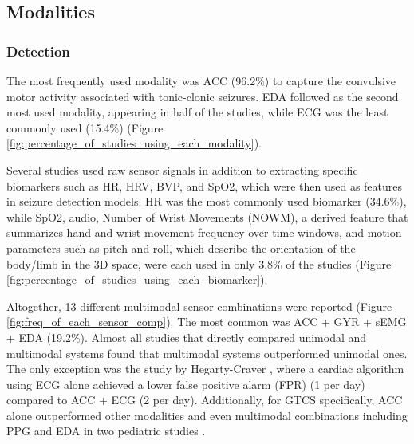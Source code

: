 \subsection{Modalities}


\subsubsection{Detection}
The most frequently used modality was ACC (96.2\%) to capture the convulsive motor activity associated with tonic-clonic seizures. EDA followed as the second most used modality, appearing in half of the studies, while ECG was the least commonly used (15.4\%) (Figure \ref{fig:percentage_of_studies_using_each_modality}).

Several studies used raw sensor signals in addition to extracting specific biomarkers such as HR, HRV, BVP, and SpO2, which were then used as features in seizure detection models. HR was the most commonly used biomarker (34.6\%), while SpO2, audio, Number of Wrist Movements (NOWM),  a derived feature that summarizes hand and wrist movement frequency over time windows, and motion parameters such as pitch and roll, which describe the orientation of the body/limb in the 3D space, were each used in only 3.8\% of the studies  (Figure \ref{fig:percentage_of_studies_using_each_biomarker}).

Altogether, 13 different multimodal sensor combinations were reported (Figure \ref{fig:freq_of_each_sensor_comp}). The most common was ACC + GYR + sEMG + EDA (19.2\%). Almost all studies that directly compared unimodal and multimodal systems \cite{Yu2023-ss,Milosevic2016-ee,De_Cooman2018-pq,Chowdhury2022-bi,Ge2023-ab, Wang2025-my,Tang2021-td,Li2022-ty,Hegarty-Craver2021-hk,Poh2012-af,Hamlin2021-sd,Wu2024-yl} found that multimodal systems outperformed unimodal ones. The only exception was the study by Hegarty-Craver \cite{Hegarty-Craver2021-hk}, where a cardiac algorithm using ECG alone achieved a lower false positive alarm (FPR) (1 per day) compared to ACC + ECG (2 per day). Additionally, for GTCS specifically, ACC alone outperformed other modalities and even multimodal combinations including PPG and EDA in two pediatric studies \cite{Yu2023-ss,Tang2021-td}. 

